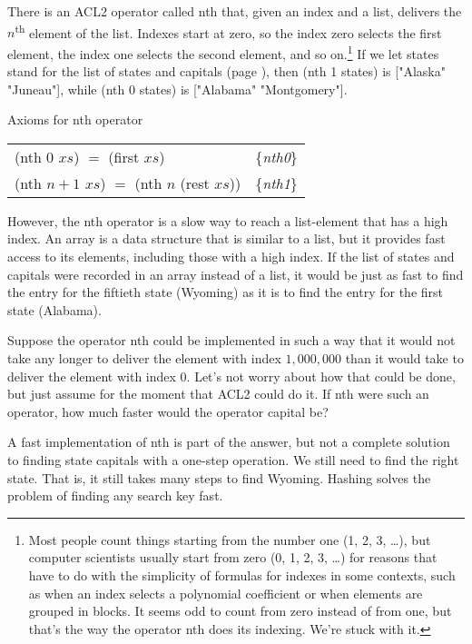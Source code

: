 There is an ACL2 operator called \textsf{nth} that,
given an index and a list, delivers the
$n$\textsuperscript{th} element of the list.
Indexes start at zero, so the index
zero selects the first element,
the index one selects the second element,
and so on.\footnote{Most people
count things starting from the number one (1, 2, 3, \dots), but
computer scientists usually start from zero (0, 1, 2, 3, \dots)
for reasons that have to do with the simplicity
of formulas for indexes in some contexts, such
as when an index selects a polynomial coefficient
or when elements are grouped in blocks.
It seems odd to count from
zero instead of from one,
but that's the way the operator
\textsf{nth} does its indexing. We're stuck with it.}
If we let \textsf{states} stand for the list of states and capitals
(page \pageref{states-capitals-list}), then
\textsf{(nth 1 states)} is \textsf{["Alaska" "Juneau"]},
while \textsf{(nth 0 states)} is \textsf{["Alabama" "Montgomery"]}.

\begin{center}
Axioms for \textsf{nth} operator
\begin{tabular}{ll}
\textsf{(nth 0} $xs$\textsf{)} $=$ \textsf{(first} $xs$\textsf{)}  & \{\emph{nth0}\}             \\
\textsf{(nth} $n+1$ $xs$\textsf{)} $=$ \textsf{(nth} $n$ \textsf{(rest} $xs$\textsf{))} & \{\emph{nth1}\} \\
\end{tabular}
\end{center}

However, the \textsf{nth} operator is a slow way to reach a
list-element that has a high index.
An array is a data structure that is
similar to a list, but it provides fast access to its
elements, including those with a high index.
If the list of states and capitals were recorded in an array instead
of a list, it would be just as fast to find the entry for the
fiftieth state (Wyoming) as it is to find the entry
for the first state (Alabama).

Suppose the operator \textsf{nth} could be implemented
in such a way that it would not take any longer to
deliver the element with index $1,000,000$ than it would take
to deliver the element with index $0$.
Let's not worry about how that could be done, but
just assume for the moment that ACL2 could do it.
If \textsf{nth} were such an operator,
how much faster would the operator \textsf{capital} be?

A fast implementation of \textsf{nth} is part of the answer,
but not a complete solution to finding state capitals
with a one-step operation.
We still need to find the right state.
That is, it still takes many steps to find Wyoming.
Hashing solves the problem of finding any search key fast.

